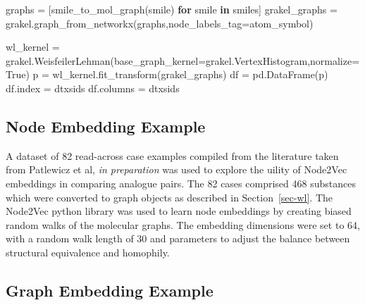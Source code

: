 \documentclass[
  super,
  preprint,
  3p]{elsarticle}
\newenvironment{Shaded}{\begin{snugshade}}{\end{snugshade}}
\newcommand{\ControlFlowTok}[1]{\textcolor[rgb]{0.00,0.23,0.31}{\textbf{#1}}}
\newcommand{\KeywordTok}[1]{\textcolor[rgb]{0.00,0.23,0.31}{\textbf{#1}}}
\newcommand{\NormalTok}[1]{\textcolor[rgb]{0.00,0.23,0.31}{#1}}
\newcommand{\OperatorTok}[1]{\textcolor[rgb]{0.37,0.37,0.37}{#1}}
\newcommand{\StringTok}[1]{\textcolor[rgb]{0.13,0.47,0.30}{#1}}
\newcommand{\VariableTok}[1]{\textcolor[rgb]{0.07,0.07,0.07}{#1}}
\begin{document}
\begin{Shaded}
\begin{Highlighting}[]
\NormalTok{graphs }\OperatorTok{=}\NormalTok{ [smile\_to\_mol\_graph(smile) }\ControlFlowTok{for}\NormalTok{ smile }\KeywordTok{in}\NormalTok{ smiles]}
\NormalTok{grakel\_graphs }\OperatorTok{=}\NormalTok{ grakel.graph\_from\_networkx(graphs,node\_labels\_tag}\OperatorTok{=}\StringTok{\textquotesingle{}atom\_symbol\textquotesingle{}}\NormalTok{)}
\end{Highlighting}
\end{Shaded}

\begin{Shaded}
\begin{Highlighting}[]
\NormalTok{wl\_kernel }\OperatorTok{=}\NormalTok{ grakel.WeisfeilerLehman(base\_graph\_kernel}\OperatorTok{=}\NormalTok{grakel.VertexHistogram,normalize}\OperatorTok{=}\VariableTok{True}\NormalTok{)}
\NormalTok{p }\OperatorTok{=}\NormalTok{ wl\_kernel.fit\_transform(grakel\_graphs)}
\NormalTok{df }\OperatorTok{=}\NormalTok{ pd.DataFrame(p)}
\NormalTok{df.index }\OperatorTok{=}\NormalTok{ dtxsids}
\NormalTok{df.columns }\OperatorTok{=}\NormalTok{ dtxsids}
\end{Highlighting}
\end{Shaded}

\subsection{Node Embedding Example}\label{sec-node2vec}

A dataset of 82 read-across case examples compiled from the literature
taken from Patlewicz et al, \emph{in preparation} was used to explore
the uility of Node2Vec embeddings in comparing analogue pairs. The 82
cases comprised 468 substances which were converted to graph objects as
described in Section~\ref{sec-wl}. The Node2Vec python library was used
to learn node embeddings by creating biased random walks of the
molecular graphs. The embedding dimensions were set to 64, with a random
walk length of 30 and parameters to adjust the balance between
structural equivalence and homophily.

\subsection{Graph Embedding Example}\label{sec-graph2vec}
\end{document}
